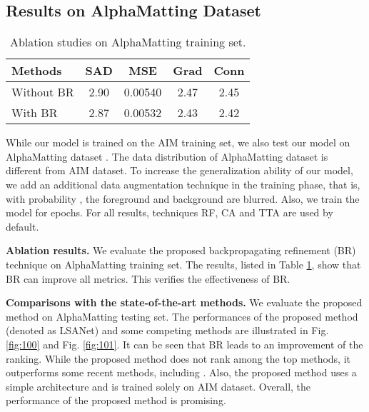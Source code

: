 \documentclass{article}
\theoremstyle{plain}
\begin{document}
\subsection{Results on AlphaMatting Dataset}

\begin{table}[b]
\centering
    \caption{
        Ablation studies on AlphaMatting training set.
}
    \label{tablewuwuwu}
\setlength\tabcolsep{4pt}
\begin{tabular}{|l|cccc|}
    \hline
    Methods & SAD & MSE & Grad & Conn  
  \\
    \hline
    Without BR
            & 2.90 &0.00540 & 2.47 & 2.45
    \\
    With BR
            & 2.87 & 0.00532 & 2.43 & 2.42
    \\
    \hline
\end{tabular}
\end{table}


While our model is trained
on the AIM training set, we also test our model on AlphaMatting dataset \cite{Rhemann2009APerceptually}.
The data distribution of AlphaMatting dataset is different from AIM dataset.
To increase the generalization ability of our model,
we add an additional data augmentation technique in the training phase, that is, with probability , the foreground and background are blurred.
Also, we train the model for  epochs.
For all results, techniques RF, CA and TTA are used by default.


\textbf{Ablation results.}
We evaluate the proposed backpropagating refinement (BR) technique on AlphaMatting training set.
The results, listed in Table \ref{tablewuwuwu},
show that BR can improve all  metrics.
This verifies the effectiveness of BR.




\textbf{Comparisons with the state-of-the-art methods.}
We evaluate the proposed method on AlphaMatting testing set.
The performances of the proposed method (denoted as LSANet)
and some competing methods are illustrated in 
Fig. \ref{fig:100} and
Fig. \ref{fig:101}.
It can be seen that BR leads to an improvement of the ranking.
While the proposed method does not rank among the top methods, it outperforms some recent methods, including \cite{Tang2019Learning-Based,Li2020NaturalImageMatting,Dai2021LearningAffinityAware,Yu2021High-ResolutionDeepImageMatting}.
Also, the proposed method uses a simple architecture and is trained solely on AIM dataset.
Overall, the performance of the proposed method is promising.
\end{document}
